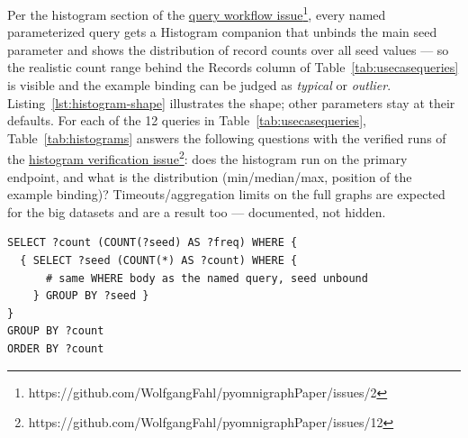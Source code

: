 \documentclass[
]{ceurart}
\newcommand{\footnotelink}[2]{\href{#1}{#2}\footnote{#1}}
\begin{document}
Per the histogram section of the
\footnotelink{https://github.com/WolfgangFahl/pyomnigraphPaper/issues/2}{query workflow issue},
every named parameterized query gets a Histogram companion that unbinds the
main seed parameter and shows the distribution of record counts over all seed
values --- so the realistic count range behind the Records column of
Table~\ref{tab:usecasequeries} is visible and the example binding can be
judged as \emph{typical} or \emph{outlier}. Listing~\ref{lst:histogram-shape} illustrates the
shape; other parameters stay at their defaults. For each of the 12 queries in Table~\ref{tab:usecasequeries}, Table~\ref{tab:histograms} answers the following questions with the verified runs of the
\footnotelink{https://github.com/WolfgangFahl/pyomnigraphPaper/issues/12}{histogram verification issue}:
does the histogram run on the primary endpoint, and what is the distribution
(min/median/max, position of the example binding)?
Timeouts/aggregation limits on the full graphs are expected for the big
datasets and are a result too --- documented, not hidden.
\begin{lstlisting}[language=SPARQL,caption={Histogram companion shape},label={lst:histogram-shape}]
SELECT ?count (COUNT(?seed) AS ?freq) WHERE {
  { SELECT ?seed (COUNT(*) AS ?count) WHERE {
      # same WHERE body as the named query, seed unbound
    } GROUP BY ?seed }
}
GROUP BY ?count
ORDER BY ?count
\end{lstlisting}
\end{document}
